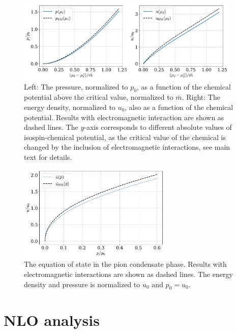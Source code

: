 \begin{figure}[!htb]
    \centering
    \includegraphics[width=0.95\textwidth]{../scripts/figurer/pion_star/pion_up.pdf}
    \caption{
        Left: The pressure, normalized to $p_0$, as a function of the chemical potential above the critical value, normalized to $\bar m$.
        Right: The energy density, normalized to $u_0$, also as a function of the chemical potential.
        Results with electromagnetic interaction are shown as dashed lines.
        The $y$-axis corresponds to different absolute values of isospin-chemical potential, as the critical value of the chemical is changed by the inclusion of electromagnetic interactions, see main text for details.
        }
        \label{fig: pressure and energy with EM interaction}
\end{figure}



\begin{figure}[!htb]
    \centering
    \includegraphics[width=0.65\textwidth]{../scripts/figurer/pion_star/pion_eos_EM.pdf}
    \caption{
        The equation of state in the pion condensate phase. 
        Results with electromagnetic interactions are shown as dashed lines.
        The energy density and pressure is normalized to $u_0$ and $p_0 = u_0$.
        }
    \label{fig: eos chpt em interaction}
\end{figure}


\section{NLO analysis}

